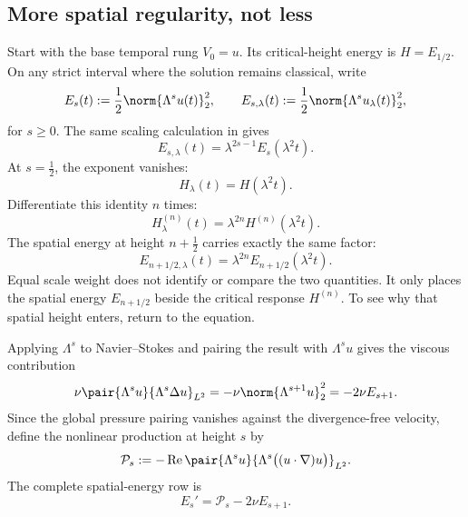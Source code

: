 \subsection{More spatial regularity, not less}\label{sub:ThePressureCompleteMixedDerivativeTower}

Start with the base temporal rung \(V_0=u\).
Its critical-height energy is \(H=E_{1/2}\).
On any strict interval where the solution remains classical, write
\[
  E_s(t):=\frac12\norm{\Lambda^su(t)}_2^2,
  \qquad
  E_{s,\lambda}(t):=\frac12\norm{\Lambda^su_\lambda(t)}_2^2,
\]
for \(s\geq0\).
The same \NavierStokes{} scaling calculation in  gives
\begin{equation}\label{eq:BodySpatialEnergyScaling}
  E_{s,\lambda}(t)
  =\lambda^{2s-1}E_s(\lambda^2t).
\end{equation}
At \(s=\tfrac12\), the exponent vanishes:
\[
  H_\lambda(t)=H(\lambda^2t).
\]
Differentiate this identity \(n\) times:
\begin{equation}\label{eq:BodyCriticalHeightTemporalScaling}
  H_\lambda^{(n)}(t)
  =\lambda^{2n}H^{(n)}(\lambda^2t).
\end{equation}
The spatial energy at height \(n+\tfrac12\) carries exactly the same factor:
\begin{equation}\label{eq:BodySpatialHeightScalingDiagonal}
  E_{n+1/2,\lambda}(t)
  =\lambda^{2n}E_{n+1/2}(\lambda^2t).
\end{equation}
Equal scale weight does not identify or compare the two quantities.
It only places the spatial energy \(E_{n+1/2}\) beside the critical response \(H^{(n)}\).
To see why that spatial height enters, return to the equation.

Applying \(\Lambda^s\) to Navier--Stokes and pairing the result with \(\Lambda^su\) gives the viscous contribution
\[
  \nu\pair{\Lambda^su}{\Lambda^s\Delta u}_{L^2}
  =-\nu\norm{\Lambda^{s+1}u}_2^2
  =-2\nu E_{s+1}.
\]
Since the global pressure pairing vanishes against the divergence-free velocity, define the nonlinear production at height \(s\) by
\[
  \mathcal P_s
  :=-
  \operatorname{Re}
  \pair{\Lambda^su}
  {\Lambda^s\bigl((u\cdot\nabla)u\bigr)}_{L^2}.
\]
The complete spatial-energy row is
\begin{equation}\label{eq:BodyCriticalEnergyBalance}
  E_s'=\mathcal P_s-2\nu E_{s+1}.
\end{equation}

